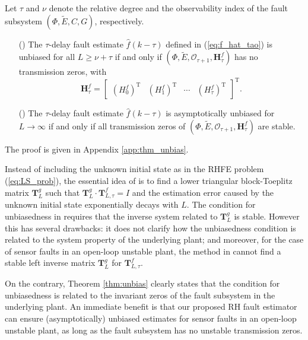 \documentclass[twocolumn]{autart}
\begin{document}
\begin{thm}\label{thm:unbias}
Let $\tau$ and $\nu$ denote the relative degree and the observability index of the fault subsystem $( \Phi, \tilde E, C, G )$, respectively.
\begin{enumerate}
  \item[(\romannumeral1)] The $\tau$-delay fault estimate $\hat f(k-\tau)$ defined in (\ref{eq:f_hat_tao}) is unbiased for all $L \geq \nu+\tau$ if and only if $( \Phi, \tilde E, \mathcal{O}_{\tau+1}, \mathbf{H}_{\tau}^f )$ has no transmission zeros, with 
\begin{equation}\label{eq:Htauf}
\mathbf{H}_{\tau}^f =
\left[ \begin{array}{cccc}
          ( H_{0}^f )^\mathrm{T} & ( H_{1}^f )^\mathrm{T} & \cdots & ( H_{\tau}^f )^\mathrm{T}
       \end{array}
 \right]^\mathrm{T}.
\end{equation}
  \item[(\romannumeral2)] The $\tau$-delay fault estimate $\hat f(k-\tau)$ is asymptotically unbiased for $L \rightarrow \infty$ if and only if all transmission zeros of $( \Phi, \tilde E, \mathcal{O}_{\tau+1}, \mathbf{H}_{\tau}^f )$ are stable.
\end{enumerate}
\end{thm}

The proof is given in Appendix \ref{app:thm_unbias}.

Instead of including the unknown initial state as in the RHFE problem (\ref{eq:LS_prob}), the essential idea of \cite{Dong2012c} is to find a lower triangular block-Toeplitz matrix $\mathbf{T}_L^g$ such that $\mathbf{T}_L^g \cdot \mathbf{T}_{L,\tau}^f = I$ and the estimation error caused by the unknown initial state exponentially decays with $L$. The condition for unbiasedness in \cite{Dong2012c} requires that the inverse system related to $\mathbf{T}_L^g$ is stable. However this has several drawbacks: it does not clarify how the unbiasedness condition is related to the system property of the underlying plant; and moreover, for the case of sensor faults in an open-loop unstable plant, the method in \cite{Dong2012c} cannot find a stable left inverse matrix $\mathbf{T}_L^g$ for $\mathbf{T}_{L,\tau}^f$.

On the contrary, Theorem \ref{thm:unbias} clearly states that the condition for unbiasedness is related to the invariant zeros of the fault subsystem in the underlying plant. An immediate benefit is that our proposed RH fault estimator can ensure (asymptotically) unbiased estimates for sensor faults in an open-loop unstable plant, as long as the fault subsystem has no unstable transmission zeros.
\end{document}
